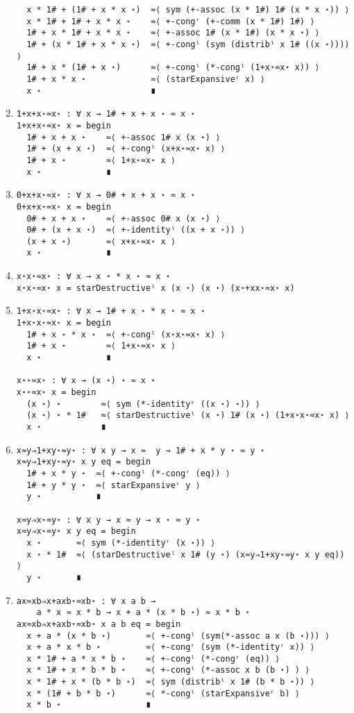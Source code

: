 \begin{enumerate}
\begin{Verbatim}
  x * 1# + (1# + x * x ⋆)  ≈⟨ sym (+-assoc (x * 1#) 1# (x * x ⋆)) ⟩
  x * 1# + 1# + x * x ⋆    ≈⟨ +-congʳ (+-comm (x * 1#) 1#) ⟩
  1# + x * 1# + x * x ⋆    ≈⟨ +-assoc 1# (x * 1#) (x * x ⋆) ⟩
  1# + (x * 1# + x * x ⋆)  ≈⟨ +-congˡ (sym (distribˡ x 1# ((x ⋆)))) ⟩
  1# + x * (1# + x ⋆)      ≈⟨ +-congˡ (*-congˡ (1+x⋆≈x⋆ x)) ⟩
  1# + x * x ⋆             ≈⟨ (starExpansiveʳ x) ⟩
  x ⋆                      ∎
\end{Verbatim}
\item
\begin{Verbatim}
1+x+x⋆≈x⋆ : ∀ x → 1# + x + x ⋆ ≈ x ⋆
1+x+x⋆≈x⋆ x = begin
  1# + x + x ⋆    ≈⟨ +-assoc 1# x (x ⋆) ⟩
  1# + (x + x ⋆)  ≈⟨ +-congˡ (x+x⋆≈x⋆ x) ⟩
  1# + x ⋆        ≈⟨ 1+x⋆≈x⋆ x ⟩
  x ⋆             ∎
\end{Verbatim}
\item
\begin{Verbatim}
0+x+x⋆≈x⋆ : ∀ x → 0# + x + x ⋆ ≈ x ⋆
0+x+x⋆≈x⋆ x = begin
  0# + x + x ⋆    ≈⟨ +-assoc 0# x (x ⋆) ⟩
  0# + (x + x ⋆)  ≈⟨ +-identityˡ ((x + x ⋆)) ⟩
  (x + x ⋆)       ≈⟨ x+x⋆≈x⋆ x ⟩
  x ⋆             ∎
\end{Verbatim}
\item
\begin{Verbatim}
x⋆x⋆≈x⋆ : ∀ x → x ⋆ * x ⋆ ≈ x ⋆
x⋆x⋆≈x⋆ x = starDestructiveˡ x (x ⋆) (x ⋆) (x⋆+xx⋆≈x⋆ x)
\end{Verbatim}
\item
\begin{Verbatim}
1+x⋆x⋆≈x⋆ : ∀ x → 1# + x ⋆ * x ⋆ ≈ x ⋆
1+x⋆x⋆≈x⋆ x = begin
  1# + x ⋆ * x ⋆  ≈⟨ +-congˡ (x⋆x⋆≈x⋆ x) ⟩
  1# + x ⋆        ≈⟨ 1+x⋆≈x⋆ x ⟩
  x ⋆             ∎

x⋆⋆≈x⋆ : ∀ x → (x ⋆) ⋆ ≈ x ⋆
x⋆⋆≈x⋆ x = begin
  (x ⋆) ⋆        ≈⟨ sym (*-identityʳ ((x ⋆) ⋆)) ⟩
  (x ⋆) ⋆ * 1#   ≈⟨ starDestructiveˡ (x ⋆) 1# (x ⋆) (1+x⋆x⋆≈x⋆ x) ⟩
  x ⋆            ∎
\end{Verbatim}
\item
\begin{Verbatim}
x≈y⇒1+xy⋆≈y⋆ : ∀ x y → x ≈  y → 1# + x * y ⋆ ≈ y ⋆
x≈y⇒1+xy⋆≈y⋆ x y eq = begin
  1# + x * y ⋆  ≈⟨ +-congˡ (*-congʳ (eq)) ⟩
  1# + y * y ⋆  ≈⟨ starExpansiveʳ y ⟩
  y ⋆           ∎

x≈y⇒x⋆≈y⋆ : ∀ x y → x ≈ y → x ⋆ ≈ y ⋆
x≈y⇒x⋆≈y⋆ x y eq = begin
  x ⋆       ≈⟨ sym (*-identityʳ (x ⋆)) ⟩
  x ⋆ * 1#  ≈⟨ (starDestructiveˡ x 1# (y ⋆) (x≈y⇒1+xy⋆≈y⋆ x y eq)) ⟩
  y ⋆       ∎
\end{Verbatim}
\item
\begin{Verbatim}
ax≈xb⇒x+axb⋆≈xb⋆ : ∀ x a b → 
	a * x ≈ x * b → x + a * (x * b ⋆) ≈ x * b ⋆
ax≈xb⇒x+axb⋆≈xb⋆ x a b eq = begin
  x + a * (x * b ⋆)       ≈⟨ +-congˡ (sym(*-assoc a x (b ⋆))) ⟩
  x + a * x * b ⋆         ≈⟨ +-congʳ (sym (*-identityʳ x)) ⟩
  x * 1# + a * x * b ⋆    ≈⟨ +-congˡ (*-congʳ (eq)) ⟩
  x * 1# + x * b * b ⋆    ≈⟨ +-congˡ (*-assoc x b (b ⋆) ) ⟩
  x * 1# + x * (b * b ⋆)  ≈⟨ sym (distribˡ x 1# (b * b ⋆)) ⟩
  x * (1# + b * b ⋆)      ≈⟨ *-congˡ (starExpansiveʳ b) ⟩
  x * b ⋆                 ∎


\end{Verbatim}
\end{enumerate}
